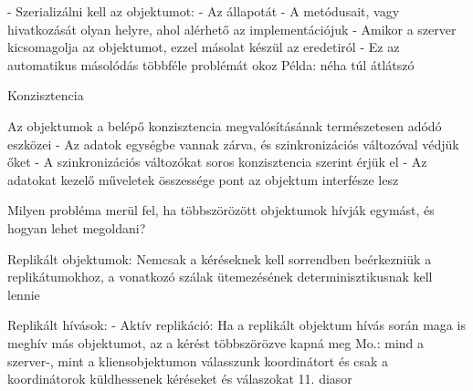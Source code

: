 \documentclass[twoside, a4paper, 12pt]{article}
\begin{document}
\begin{description}
                                                                        - Szerializálni kell az objektumot:
                                                                        - Az állapotát
                                                                        - A metódusait, vagy hivatkozását olyan helyre, ahol alérhető az implementációjuk
                                                                        - Amikor a szerver kicsomagolja az objektumot, ezzel másolat készül az eredetiról
                                                                        - Ez az automatikus másolódás többféle problémát okoz Példa: néha túl átlátszó
                                                                    \item  Konzisztencia 
                                                                    \item Az objektumok a belépő konzisztencia megvalósításának természetesen adódó eszközei
                                                                        - Az adatok egységbe vannak zárva, és szinkronizációs változóval védjük őket
                                                                        - A szinkronizációs változókat soros konzisztencia szerint érjük el
                                                                        - Az adatokat kezelő műveletek összessége pont az objektum interfésze lesz
                                                                    \item  Milyen probléma merül fel, ha többszörözött objektumok hívják
                                                                        egymást, és hogyan lehet megoldani?  
                                                                    \item Replikált objektumok: Nemcsak a kéréseknek kell sorrendben beérkezniük a replikátumokhoz, a vonatkozó szálak ütemezésének
                                                                        determinisztikusnak kell lennie
                                                                    \item Replikált hívások:
                                                                        - Aktív replikáció: Ha a replikált objektum hívás során maga is meghív más objektumot, az a kérést többszörözve kapná meg
                                                                        Mo.: mind a szerver-, mint a kliensobjektumon válasszunk koordinátort és csak a koordinátorok küldhessenek kéréseket és válaszokat
                                                                        11. diasor

\end{description}
\end{document}

